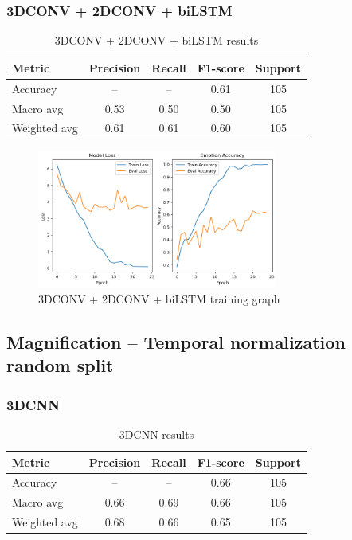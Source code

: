 \documentclass{article}
\begin{document}
\subsubsection{3DCONV + 2DCONV + biLSTM}

\begin{table}[H]
\centering
\caption{3DCONV + 2DCONV + biLSTM results}
\begin{tabular}{|l|c|c|c|c|}
\hline
\textbf{Metric} & \textbf{Precision} & \textbf{Recall} & \textbf{F1-score} & \textbf{Support} \\
\hline
Accuracy       & --   & --   & 0.61 & 105 \\
Macro avg      & 0.53 & 0.50 & 0.50 & 105 \\
Weighted avg   & 0.61 & 0.61 & 0.60 & 105 \\
\hline
\end{tabular}%
\label{tab:table4}
\end{table}

\begin{figure}[H]
  \begin{center}
    \includegraphics*[width=0.7\textwidth]{Figures/Picture8.png}
  \end{center}
  \caption{3DCONV + 2DCONV + biLSTM training graph}
  \label{fig:fig8}
\end{figure}

\subsection{Magnification – Temporal normalization random split}
\subsubsection{3DCNN}

\begin{table}[H]
\centering
\caption{3DCNN results}
\begin{tabular}{|l|c|c|c|c|}
\hline
\textbf{Metric} & \textbf{Precision} & \textbf{Recall} & \textbf{F1-score} & \textbf{Support} \\
\hline
Accuracy       & --   & --   & 0.66 & 105 \\
Macro avg      & 0.66 & 0.69 & 0.66 & 105 \\
Weighted avg   & 0.68 & 0.66 & 0.65 & 105 \\
\hline
\end{tabular}%
\label{tab:table5}
\end{table}
\end{document}
